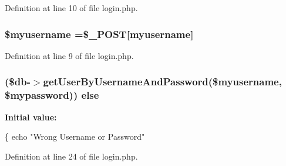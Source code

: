 Definition at line 10 of file login.\+php.

\hypertarget{php_2login_8php_a5dacfe932d81e07fdb90fc80dbf5a03f}{}
\subsubsection[{\$myusername}]{\setlength{\rightskip}{0pt plus 5cm}\$myusername =\$\+\_\+\+P\+O\+S\+T\mbox{[}\textquotesingle{}myusername\textquotesingle{}\mbox{]}}\label{php_2login_8php_a5dacfe932d81e07fdb90fc80dbf5a03f}


Definition at line 9 of file login.\+php.

\hypertarget{php_2login_8php_a6986c10ba08e74cdfb9f3ac3a66f9af9}{}
\subsubsection[{else}]{ (\$db-\/$>$get\+User\+By\+Username\+And\+Password(\$myusername, \$mypassword)) else}\label{php_2login_8php_a6986c10ba08e74cdfb9f3ac3a66f9af9}
{\bfseries Initial value\+:}
\begin{DoxyCode}
\{
    echo \textcolor{stringliteral}{"Wrong Username or Password"}
\end{DoxyCode}


Definition at line 24 of file login.\+php.

